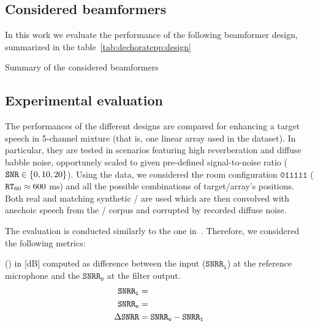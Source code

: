 \subsection{Considered beamformers}
In this work we evaluate the performance of the following beamformer design, summarized in the table~\cref{tab:dechoratepp:design}

\begin{table}[!h]
    \begin{fullwidth}

        \centering
        \small
        
        \caption{Summary of the considered beamformers}
        \label{tab:dechorateapp:design}

    \end{fullwidth}
\end{table}



\subsection{Experimental evaluation}
The performances of the different designs are compared for enhancing a target speech in 5-channel mixture (that is, one linear array used in the \dEchorate{} dataset).
In particular, they are tested in scenarios featuring high reverberation and diffuse babble noise, opportunely scaled to given pre-defined signal-to-noise ratio ($\SNR \in \kbrace{0, 10, 20}$).
Using the \dEchorate{} data, we considered the room configuration $\mathtt{011111}$ ($\mathtt{RT}_{60} \approx 600 $ ms) and all the possible combinations of target/array's positions.
Both real and matching synthetic \RIRs/ are used which are then convolved with anechoic speech from the \WSJ/ corpus and corrupted by recorded diffuse noise.

\mynewline
The evaluation is conducted similarly to the one in~.
Therefore, we considered the following metrics:


 (\DSNRR) in [dB] computed as difference between the input ($\mathtt{SNRR}_\mathtt{i}$) at the reference microphone and the $\mathtt{SNRR}_\mathtt{o}$ at the filter output.
    \begin{equation}
        \begin{aligned}
            \mathtt{SNRR}_\mathtt{i} &=\\
            \mathtt{SNRR}_\mathtt{o}&=\\
            \Delta\mathtt{SNRR} &= \mathtt{SNRR}_\mathtt{o} - \mathtt{SNRR}_\mathtt{i}
        \end{aligned}
    \end{equation}


